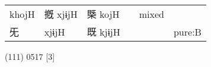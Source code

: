 \documentclass[14pt,a4paper]{scrartcl}
\begin{document}
\begin{longtable}[c]{@{}llllll@{}}
\begin{minipage}[t]{0.14\columnwidth}
khojH
\strut\end{minipage} &
\begin{minipage}[t]{0.14\columnwidth}\raggedright\strut
摡 xjɨjH
\strut\end{minipage} &
\begin{minipage}[t]{0.14\columnwidth}\raggedright\strut
㮣 kojH
\strut\end{minipage} &
\begin{minipage}[t]{0.14\columnwidth}\raggedright\strut
\strut\end{minipage} &
\begin{minipage}[t]{0.14\columnwidth}\raggedright\strut
mixed
\strut\end{minipage}\tabularnewline
\begin{minipage}[t]{0.14\columnwidth}\raggedright\strut
旡
\strut\end{minipage} &
\begin{minipage}[t]{0.14\columnwidth}\raggedright\strut
xjɨjH
\strut\end{minipage} &
\begin{minipage}[t]{0.14\columnwidth}\raggedright\strut
既 kjɨjH
\strut\end{minipage} &
\begin{minipage}[t]{0.14\columnwidth}\raggedright\strut
\strut\end{minipage} &
\begin{minipage}[t]{0.14\columnwidth}\raggedright\strut
\strut\end{minipage} &
\begin{minipage}[t]{0.14\columnwidth}\raggedright\strut
pure:B
\strut\end{minipage}\tabularnewline
\bottomrule
\end{longtable}

(111) 0517 {[}3{]}
\end{document}
